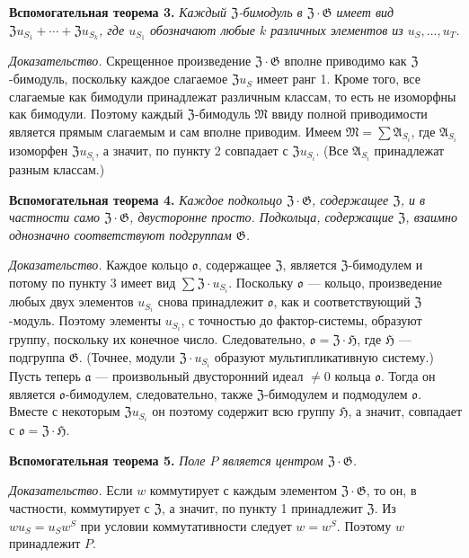 \documentclass[11pt]{article}
\begin{document}
\noindent\textbf{Вспомогательная теорема 3.} \emph{Каждый \(\mathfrak Z\)-бимодуль в \(\mathfrak Z\cdot\mathfrak G\) имеет вид \(\mathfrak Zu_{S_1}+\cdots+\mathfrak Zu_{S_k}\), где \(u_{S_1}\) обозначают любые \(k\) различных элементов из \(u_S,\ldots,u_T\).}

\noindent\emph{Доказательство.} Скрещенное произведение \(\mathfrak Z\cdot\mathfrak G\) вполне приводимо как \(\mathfrak Z\)-бимодуль, поскольку каждое слагаемое \(\mathfrak Zu_S\) имеет ранг 1. Кроме того, все слагаемые как бимодули принадлежат различным классам, то есть не изоморфны как бимодули. Поэтому каждый \(\mathfrak Z\)-бимодуль \(\mathfrak M\) ввиду полной приводимости является прямым слагаемым и сам вполне приводим. Имеем \(\mathfrak M=\sum\mathfrak A_{S_i}\), где \(\mathfrak A_{S_i}\) изоморфен \(\mathfrak Zu_{S_i}\), а значит, по пункту 2 совпадает с \(\mathfrak Zu_{S_i}\). (Все \(\mathfrak A_{S_i}\) принадлежат разным классам.)

\noindent\textbf{Вспомогательная теорема 4.} \emph{Каждое подкольцо \(\mathfrak Z\cdot\mathfrak G\), содержащее \(\mathfrak Z\), и в частности само \(\mathfrak Z\cdot\mathfrak G\), двусторонне просто. Подкольца, содержащие \(\mathfrak Z\), взаимно однозначно соответствуют подгруппам \(\mathfrak G\).}

\noindent\emph{Доказательство.} Каждое кольцо \(\mathfrak o\), содержащее \(\mathfrak Z\), является \(\mathfrak Z\)-бимодулем и потому по пункту 3 имеет вид \(\sum\mathfrak Z\cdot u_{S_i}\). Поскольку \(\mathfrak o\) --- кольцо, произведение любых двух элементов \(u_{S_i}\) снова принадлежит \(\mathfrak o\), как и соответствующий \(\mathfrak Z\)-модуль. Поэтому элементы \(u_{S_i}\), с точностью до фактор-системы, образуют группу, поскольку их конечное число. Следовательно, \(\mathfrak o=\mathfrak Z\cdot\mathfrak H\), где \(\mathfrak H\) --- подгруппа \(\mathfrak G\). (Точнее, модули \(\mathfrak Z\cdot u_{S_i}\) образуют мультипликативную систему.) Пусть теперь \(\mathfrak a\) --- произвольный двусторонний идеал \(\neq0\) кольца \(\mathfrak o\). Тогда он является \(\mathfrak o\)-бимодулем, следовательно, также \(\mathfrak Z\)-бимодулем и подмодулем \(\mathfrak o\). Вместе с некоторым \(\mathfrak Zu_{S_i}\) он поэтому содержит всю группу \(\mathfrak H\), а значит, совпадает с \(\mathfrak o=\mathfrak Z\cdot\mathfrak H\).

\noindent\textbf{Вспомогательная теорема 5.} \emph{Поле \(P\) является центром \(\mathfrak Z\cdot\mathfrak G\).}

\noindent\emph{Доказательство.} Если \(w\) коммутирует с каждым элементом \(\mathfrak Z\cdot\mathfrak G\), то он, в частности, коммутирует с \(\mathfrak Z\), а значит, по пункту 1 принадлежит \(\mathfrak Z\). Из \(wu_S=u_Sw^S\) при условии коммутативности следует \(w=w^S\). Поэтому \(w\) принадлежит \(P\).
\end{document}
